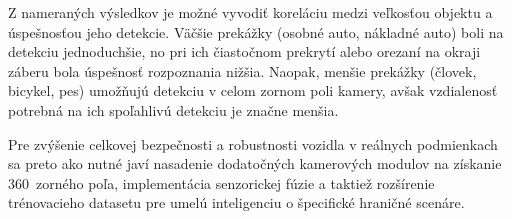 Z nameraných výsledkov je možné vyvodiť koreláciu medzi veľkosťou objektu a úspešnosťou jeho detekcie. Väčšie prekážky (osobné auto, nákladné auto) boli na detekciu jednoduchšie, no pri ich čiastočnom prekrytí alebo orezaní na okraji záberu bola úspešnosť rozpoznania nižšia. Naopak, menšie prekážky (človek, bicykel, pes) umožňujú detekciu v celom zornom poli kamery, avšak vzdialenosť potrebná na ich spoľahlivú detekciu je značne menšia.\par
Pre zvýšenie celkovej bezpečnosti a robustnosti vozidla v reálnych podmienkach sa preto ako nutné javí nasadenie dodatočných kamerových modulov na získanie 360~zorného poľa, implementácia senzorickej fúzie a taktiež rozšírenie trénovacieho datasetu pre umelú inteligenciu o špecifické hraničné scenáre.
